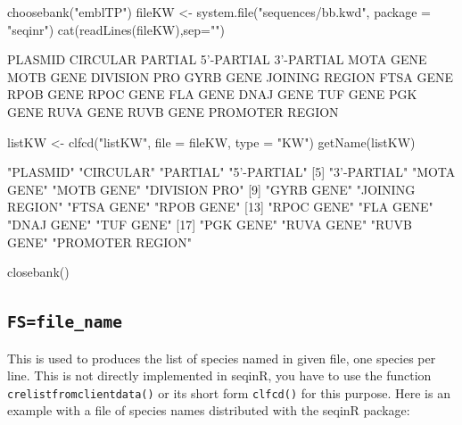\documentclass{article}
\begin{document}
\begin{Schunk}
\begin{Sinput}
 choosebank("emblTP")
 fileKW <- system.file("sequences/bb.kwd", package = "seqinr")
 cat(readLines(fileKW),sep="\n")
\end{Sinput}
\begin{Soutput}
PLASMID
CIRCULAR
PARTIAL
5'-PARTIAL
3'-PARTIAL
MOTA GENE
MOTB GENE
DIVISION PRO
GYRB GENE
JOINING REGION
FTSA GENE
RPOB GENE
RPOC GENE
FLA GENE
DNAJ GENE
TUF GENE
PGK GENE
RUVA GENE
RUVB GENE
PROMOTER REGION
\end{Soutput}
\begin{Sinput}
 listKW <- clfcd("listKW", file = fileKW, type = "KW")
 getName(listKW) 
\end{Sinput}
\begin{Soutput}
 [1] "PLASMID"         "CIRCULAR"        "PARTIAL"         "5'-PARTIAL"     
 [5] "3'-PARTIAL"      "MOTA GENE"       "MOTB GENE"       "DIVISION PRO"   
 [9] "GYRB GENE"       "JOINING REGION"  "FTSA GENE"       "RPOB GENE"      
[13] "RPOC GENE"       "FLA GENE"        "DNAJ GENE"       "TUF GENE"       
[17] "PGK GENE"        "RUVA GENE"       "RUVB GENE"       "PROMOTER REGION"
\end{Soutput}
\begin{Sinput}
 closebank()
\end{Sinput}
\end{Schunk}

\subsection{\texttt{FS=file\_name}}

This is used to produces the list of species named in given file, one species per line.
This is not directly implemented in seqinR, you have to use the function
\texttt{crelistfromclientdata()} or its short form \texttt{clfcd()} for this purpose. Here is an example with
a file of species names distributed with the seqinR package:
\end{document}
